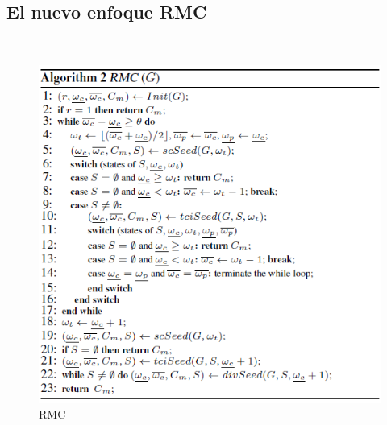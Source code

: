 \subsection{El nuevo enfoque RMC} 
\\
\begin{figure}[h!]
\centering
\includegraphics[scale=.8]{img/imagen10.png}
\caption{RMC}
\label{Comandos}
\end{figure}

